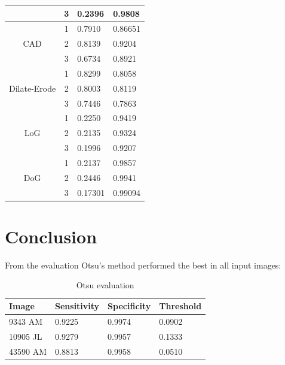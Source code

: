 \documentclass{article}
\begin{document}
\begin{table}[H]
\begin{tabular}{|c|c|l|l|}
                                    & 3                          & 0.2396      & 0.9808      \\ \hline
\multirow{3}{*}{CAD}                & 1                          & 0.7910      & 0.86651     \\ \cline{2-4} 
                                    & 2                          & 0.8139      & 0.9204      \\ \cline{2-4} 
                                    & 3                          & 0.6734      & 0.8921      \\ \hline
\multirow{3}{*}{Dilate-Erode}       & 1                          & 0.8299      & 0.8058      \\ \cline{2-4} 
                                    & 2                          & 0.8003      & 0.8119      \\ \cline{2-4} 
                                    & 3                          & 0.7446      & 0.7863      \\ \hline
\multirow{3}{*}{LoG}                & 1                          & 0.2250      & 0.9419      \\ \cline{2-4} 
                                    & 2                          & 0.2135      & 0.9324      \\ \cline{2-4} 
                                    & 3                          & 0.1996      & 0.9207      \\ \hline
\multirow{3}{*}{DoG}                & 1                          & 0.2137      & 0.9857      \\ \cline{2-4} 
                                    & 2                          & 0.2446      & 0.9941      \\ \cline{2-4} 
                                    & 3                          & 0.17301     & 0.99094     \\ \hline
\end{tabular}
\end{table}
	
	\section{Conclusion}

	From the evaluation Otsu's method performed the best in all input images:
	
\begin{table}[H]
\centering
\caption{Otsu evaluation}
\label{otsu}
\begin{tabular}{@{}llll@{}}
\toprule
Image    & Sensitivity & Specificity & Threshold \\ \midrule
9343 AM  & 0.9225      & 0.9974      & 0.0902    \\
10905 JL & 0.9279      & 0.9957      & 0.1333    \\
43590 AM & 0.8813      & 0.9958      & 0.0510    \\ \bottomrule
\end{tabular}
\end{table}
\end{document}
